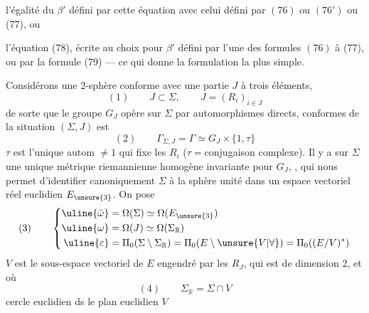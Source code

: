 l'égalité du $\beta'$ défini par cette équation avec celui défini par  $(76)$ ou $(76')$ ou (77), ou

l'équation (78), écrite au choix pour $\beta'$ défini par l'une des formules $(76)$ à (77), ou par la formule (79) --- ce qui donne la formulation la plus simple.

Considérons une 2-sphère conforme \inserted{$\Sigma$} avec une partie $J$ à trois éléments,
\[
(1)\qquad J\subset\Sigma,\qquad J=(R_i)_{i\in J}
\]
de sorte que le groupe $G_J$ opère sur $\Sigma$ par automorphismes  directs,    conformes de la situation $(\Sigma,J)$ est
\[
(2)\qquad\Gamma_{\Sigma,J}=\Gamma\simeq G_J\times\{1,\tau\}
\]
$\tau$ est l'unique autom $\ne1$  qui fixe les $R_i$  ($\tau={}$conjugaison complexe).
Il y a sur $\Sigma$ une unique métrique riemannienne homogène invariante pour $G_J$,  , qui nous permet d'identifier canoniquement $\Sigma$ à la sphère unité dans un espace vectoriel réel euclidien $E_{\unsure{3}}$. On pose
\[
(3)\qquad\left\{\begin{aligned}
\uline{\bar\omega}&=\Omega(\Sigma)\simeq\Omega(E_{\unsure{3}})\\
\uline{\omega}&=\Omega(J)\simeq\Omega(\Sigma_{\mathbb R})\\
\uline{\varepsilon}&=\Pi_0(\Sigma\setminus\Sigma_{\mathbb R})=\Pi_0(E\setminus\unsure{V|\forall})=\Pi_0((E/V)^*)
\end{aligned}\right.
\]
$V$ est le sous-espace vectoriel de $E$ engendré par les $R_J$, qui est de dimension 2, et où
\[
(4)\qquad\Sigma_{\mathbb R}=\Sigma\cap V
\]
cercle euclidien ds le plan euclidien $V$

